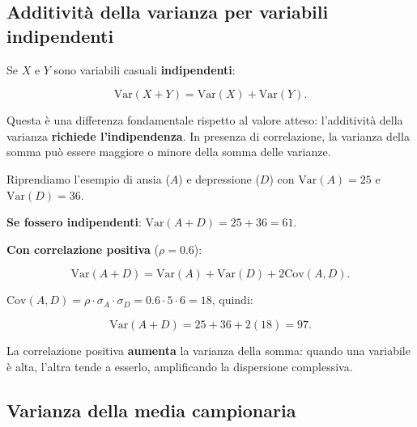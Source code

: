 \documentclass[
  italian,
  letterpaper,
  a4paper,
  11pt,
  open=any]{scrbook}
\theoremstyle{plain}
\theoremstyle{definition}
\theoremstyle{definition}
\theoremstyle{remark}
\begin{document}
\subsection{Additività della varianza per variabili
indipendenti}\label{additivituxe0-della-varianza-per-variabili-indipendenti}

Se \(X\) e \(Y\) sono variabili casuali \textbf{indipendenti}:

\[
\text{Var}(X + Y) = \text{Var}(X) + \text{Var}(Y).
\]

Questa è una differenza fondamentale rispetto al valore atteso:
l'additività della varianza \textbf{richiede l'indipendenza}. In
presenza di correlazione, la varianza della somma può essere maggiore o
minore della somma delle varianze.

\begin{tcolorbox}[enhanced jigsaw, arc=.35mm, bottomrule=.15mm, bottomtitle=1mm, breakable, colback=white, colbacktitle=quarto-callout-note-color!10!white, colframe=quarto-callout-note-color-frame, coltitle=black, left=2mm, leftrule=.75mm, opacityback=0, opacitybacktitle=0.6, rightrule=.15mm, title=\textcolor{quarto-callout-note-color}{\faInfo}\hspace{0.5em}{Esempio: perché l'indipendenza conta}, titlerule=0mm, toprule=.15mm, toptitle=1mm]

Riprendiamo l'esempio di ansia (\(A\)) e depressione (\(D\)) con
\(\text{Var}(A) = 25\) e \(\text{Var}(D) = 36\).

\textbf{Se fossero indipendenti}: \(\text{Var}(A + D) = 25 + 36 = 61\).

\textbf{Con correlazione positiva} (\(\rho = 0.6\)):

\[
\text{Var}(A + D) = \text{Var}(A) + \text{Var}(D) + 2\text{Cov}(A, D).
\]

\(\text{Cov}(A, D) = \rho \cdot \sigma_A \cdot \sigma_D = 0.6 \cdot 5 \cdot 6 = 18\),
quindi:

\[
\text{Var}(A + D) = 25 + 36 + 2(18) = 97.
\]

La correlazione positiva \textbf{aumenta} la varianza della somma:
quando una variabile è alta, l'altra tende a esserlo, amplificando la
dispersione complessiva.

\end{tcolorbox}

\subsection{Varianza della media
campionaria}\label{varianza-della-media-campionaria}
\end{document}
